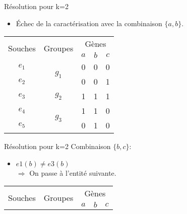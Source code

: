 \begin{overprint}
{\begin{minipage}[r]{0.46\linewidth}
\begin{block}{Résolution pour k=2}
\begin{itemize}
						\item<19> Échec de la caractérisation avec la combinaison $\{a,b\}$.
					\end{itemize}
				\end{block}
			\end{minipage}
		}
		{
			\begin{minipage}[l]{0.46\linewidth}
				\begin{center}
					\begin{tabular}{|c||c|c|c|c|}
						\hline
						\multirow{2}{*}{Souches}&\multirow{2}{*}{Groupes}&\multicolumn{3}{c|}{Gènes
						}\\
						&&$a$&\cellcolor{blue!75}$b$&\cellcolor{blue!75}$c$\\
						\hline
						\hline
						$e_1$&\multirow{2}{*}{$g_1$}& 0 & \cellcolor{cyan}0 & 0\\
						\cline{1-1} \cline{3-5}
						$e_2$&& 0 & 0 & 1\\
						\hline
						\hline
						$e_3$&$g_2$& 1 & \cellcolor{cyan}1 & 1\\
						\hline
						\hline
						$e_4$&\multirow{2}{*}{$g_3$}& 1 & 1 & 0\\
						\cline{1-1} \cline{3-5}
						$e_5$&& 0 & 1 & 0\\
						\hline
					\end{tabular}
				\end{center}
			\end{minipage}
			\hspace{0.6cm}
			\begin{minipage}[r]{0.46\linewidth}
				\begin{block}{Résolution pour k=2}
					Combinaison $\{b,c\}$:
					\begin{itemize}
						\item $e1(b) \not = e3(b) $ \\ $\Rightarrow$ On passe à l'entité suivante.
					\end{itemize}
				\end{block}
			\end{minipage}
		}
		\only<21>
		{
			\begin{minipage}[l]{0.46\linewidth}
				\begin{center}
					\begin{tabular}{|c||c|c|c|c|}
						\hline
						\multirow{2}{*}{Souches}&\multirow{2}{*}{Groupes}&\multicolumn{3}{c|}{Gènes
						}\\
						&&$a$&\cellcolor{blue!75}$b$&\cellcolor{blue!75}$c$\\

\end{tabular}
\end{center}
\end{minipage}}
\end{overprint}
